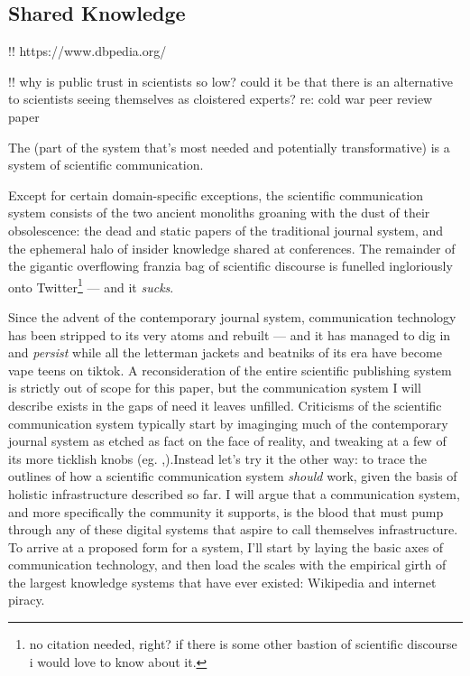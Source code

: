 \documentclass{article}
\begin{document}
\hypertarget{shared-knowledge}{%
\subsection{Shared Knowledge}\label{shared-knowledge}}

!! https://www.dbpedia.org/

!! why is public trust in scientists so low? could it be that there is
an alternative to scientists seeing themselves as cloistered experts?
re: cold war peer review paper

The (part of the system that's most needed and potentially
transformative) is a system of scientific communication.

Except for certain domain-specific exceptions, the scientific
communication system consists of the two ancient monoliths groaning with
the dust of their obsolescence: the dead and static papers of the
traditional journal system, and the ephemeral halo of insider knowledge
shared at conferences. The remainder of the gigantic overflowing franzia
bag of scientific discourse is funelled ingloriously onto
Twitter\footnote{no citation needed, right? if there is some other
  bastion of scientific discourse i would love to know about it.} ---
and it \emph{sucks}.

Since the advent of the contemporary journal system, communication
technology has been stripped to its very atoms and rebuilt --- and it
has managed to dig in and \emph{persist} while all the letterman jackets
and beatniks of its era have become vape teens on tiktok. A
reconsideration of the entire scientific publishing system is strictly
out of scope for this paper, but the communication system I will
describe exists in the gaps of need it leaves unfilled. Criticisms of
the scientific communication system typically start by imaginging much
of the contemporary journal system as etched as fact on the face of
reality, and tweaking at a few of its more ticklish knobs (eg. \cite{heesenPeerReviewGood2020},).Instead let's try it the other way: to
trace the outlines of how a scientific communication system
\emph{should} work, given the basis of holistic infrastructure described
so far. I will argue that a communication system, and more specifically
the community it supports, is the blood that must pump through any of
these digital systems that aspire to call themselves infrastructure. To
arrive at a proposed form for a system, I'll start by laying the basic
axes of communication technology, and then load the scales with the
empirical girth of the largest knowledge systems that have ever existed:
Wikipedia and internet piracy.
\end{document}
